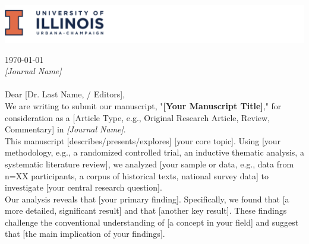 \documentclass[11pt]{article}
\begin{document}
 \begin{center}
     \includegraphics[width=\textwidth]{header.png}
 \end{center}
 \vspace{0.4cm}


 \hfill \today \\
\noindent \textit{[Journal Name]}\\
~\\
Dear [Dr. Last Name, / Editors],\\

We are writing to submit our manuscript, "\textbf{[Your Manuscript Title]}," for consideration as a [Article Type, e.g., Original Research Article, Review, Commentary] in \textit{[Journal Name]}.\\

This manuscript [describes/presents/explores] [your core topic]. Using [your methodology, e.g., a randomized controlled trial, an inductive thematic analysis, a systematic literature review], we analyzed [your sample or data, e.g., data from n=XX participants, a corpus of historical texts, national survey data] to investigate [your central research question].\\

Our analysis reveals that [your primary finding]. Specifically, we found that [a more detailed, significant result] and that [another key result]. These findings challenge the conventional understanding of [a concept in your field] and suggest that [the main implication of your findings].\\
\end{document}
